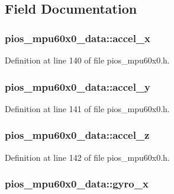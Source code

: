 \subsection{Field Documentation}
\hypertarget{structpios__mpu60x0__data_a5a5f295bda1bd7d7a3d00d02034a49e8}{
\subsubsection[{accel\-\_\-x}]{ pios\-\_\-mpu60x0\-\_\-data\-::accel\-\_\-x}}\label{structpios__mpu60x0__data_a5a5f295bda1bd7d7a3d00d02034a49e8}


Definition at line 140 of file pios\-\_\-mpu60x0.\-h.

\hypertarget{structpios__mpu60x0__data_a730c9c5aff6db5ecad97a13fba4da981}{
\subsubsection[{accel\-\_\-y}]{ pios\-\_\-mpu60x0\-\_\-data\-::accel\-\_\-y}}\label{structpios__mpu60x0__data_a730c9c5aff6db5ecad97a13fba4da981}


Definition at line 141 of file pios\-\_\-mpu60x0.\-h.

\hypertarget{structpios__mpu60x0__data_a20c00b7ce03653dd56fc9bfe364eac75}{
\subsubsection[{accel\-\_\-z}]{ pios\-\_\-mpu60x0\-\_\-data\-::accel\-\_\-z}}\label{structpios__mpu60x0__data_a20c00b7ce03653dd56fc9bfe364eac75}


Definition at line 142 of file pios\-\_\-mpu60x0.\-h.

\hypertarget{structpios__mpu60x0__data_a6369d6fde9747bdd53c2dda900377b0c}{
\subsubsection[{gyro\-\_\-x}]{ pios\-\_\-mpu60x0\-\_\-data\-::gyro\-\_\-x}}\label{structpios__mpu60x0__data_a6369d6fde9747bdd53c2dda900377b0c}


